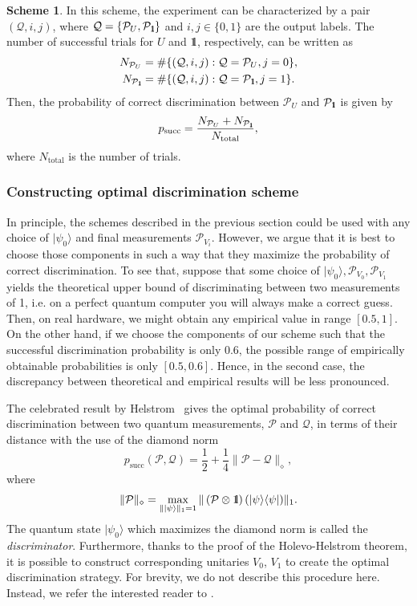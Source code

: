\documentclass[preprint,12pt, a4paper, dvipsnames]{elsarticle}
\newcommand{\ket}[1]{\ensuremath{|#1\rangle}}
\newcommand{\bra}[1]{\ensuremath{\langle#1|}}
\newcommand{\ketbra}[2]{\ensuremath{\ket{#1}\bra{#2}}}
\newcommand{\proj}[1]{\ensuremath{\ketbra{#1}{#1}}}
\newcommand{\1}{{\rm 1\hspace{-0.9mm}l}}
\newcommand{\Id}{{\rm 1\hspace{-0.9mm}l}}
\newcommand{\PP}{\mathcal{P}}
\theoremstyle{definition}
\newtheorem{scheme}{Scheme}
\begin{document}
\begin{scheme}
	In this scheme, the experiment can be characterized by a pair $(\mathcal{Q}, i,j)$, where
	$\mathcal{Q} = \{ \PP_{U}, \PP_{\Id} \}$ and $i,j \in \{0,1\}$ are the output labels. The number of successful trials for $U$ and $\Id$,
	respectively, can be written  as
	\begin{eqnarray}
	N_{\PP_U} &= \#\{(\mathcal{Q},  i, j): \mathcal{Q} = \PP_U, j = 0\}, \\
	N_{\PP_\Id} &= \#\{(\mathcal{Q},  i, j): \mathcal{Q} = \PP_\Id, j = 1\}.
	\end{eqnarray}
	Then, the probability of correct discrimination between $\PP_{U} $ and $\PP_\Id$ is given by
	\begin{equation}
	p_{\text{succ}} = \frac{N_{\PP_{U}} + N_{\PP_{\Id}}}{N_{\text{total}}},
	\end{equation}
	where $N_{\text{total}}$ is the number of trials.
\end{scheme}

\subsubsection{Constructing optimal discrimination scheme}

In principle, the schemes described in the previous section could be used with any choice of
$\ket{\psi_0}$ and final measurements $\PP_{V_i}$. However, we argue that it is best to choose those
components in such a way that they maximize the probability of correct discrimination. To see that,
suppose that some choice of $\ket{\psi_0}, \PP_{V_0}, \PP_{V_1}$ yields the theoretical upper bound
of discriminating between two measurements of 1, i.e. on a perfect quantum computer you will always
make a correct guess. Then, on real hardware, we might obtain any empirical value in range $[0.5,
1]$. On the other hand, if we choose the components of our scheme such that the successful
discrimination probability is only 0.6, the possible range of empirically obtainable probabilities
is only $[0.5, 0.6]$. Hence, in the second case, the discrepancy between theoretical and empirical
results will be less pronounced.

The celebrated result by Helstrom~\cite{helstrom1976quantum} gives the optimal  probability of correct discrimination between two quantum measurements, $\PP$  and $\mathcal{Q}$,
in terms of their distance with the use of the diamond norm
\begin{equation}
p_{\text{succ}}(\PP, \mathcal{Q}) =  \frac12 + \frac14 \| \PP - \mathcal{Q} \|_\diamond,
\end{equation}
where
\begin{equation}
\|\PP\|_\diamond = \max_{\| \ket{\psi}\|_1=1} \| \left(\PP \otimes \1\right) (\proj{\psi}) \|_1.
\end{equation}
The quantum state $\ket{\psi_0}$ which maximizes the diamond norm is called the
\emph{discriminator}. Furthermore,  thanks to the proof of the Holevo-Helstrom theorem, it is
possible to construct corresponding unitaries $V_0$, $V_1$ to create the optimal
discrimination strategy. For brevity, we do not describe this procedure here. Instead, we refer the
interested reader to \cite{watrous}.
\end{document}
